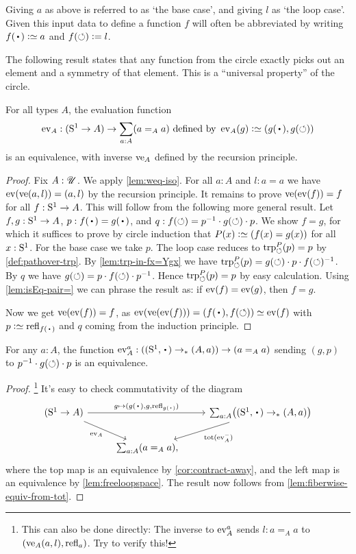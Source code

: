 Giving $a$ as above is referred to as `the base case', and
giving $l$ as `the loop case'. Given this input data to define
a function $f$ will often be abbreviated by writing
$f(\base)\defeq a$ and $f(\circlearrowleft)\mathrel{\vcentcolon=} l$.

The following result states that any function from the circle exactly
picks out an element and a symmetry of that element.
This is a ``universal property'' of the circle.

\begin{theorem}\label{lem:freeloopspace}
For all types $A$, the evaluation function
\[
\ev_A : (\Sc\to A)\to \sum_{a:A}(a=_Aa)\text{~defined by~}
\ev_A(g)\defeq (g(\base),g(\Sloop))
\]
is an equivalence, with inverse $\ve_A$ defined by the recursion principle.
\end{theorem}
\begin{proof}
Fix $A:{\mathscr{U}}$. We apply \cref{lem:weq-iso}.
For all $a:A$ and $l:a=a$ we have $\ev(\ve(a,l))=(a,l)$
by the recursion principle. It remains to prove
$\ve(\ev(f))=f$ for all $f:{\mathrm{S}^1}\to A$. This will follow
from the following more general result.
Let $f,g:{\mathrm{S}^1}\to A$,
$p: f(\base)= g(\base)$, and $q: f(\circlearrowleft) = p^{-1}\cdot g(\circlearrowleft)\cdot p$.
We show $f=g$, for which it suffices to prove by circle induction
that $P(x)\defeq(f(x)=g(x))$ for all $x:{\mathrm{S}^1}$.
For the base case we take $p$.
The loop case reduces to $\trp[P]{\Sloop}(p)=p$ by \cref{def:pathover-trp}.
By \cref{lem:trp-in-fx=Ygx} we have
$\trp[P]{\Sloop}(p)=g(\Sloop)\cdot p \cdot f(\Sloop)^{-1}$.
By $q$ we have $g(\circlearrowleft) = p\cdot f(\circlearrowleft) \cdot p^{-1}$.
Hence $\trp[P]{\Sloop}(p)=p$ by easy calculation.
Using \cref{lem:isEq-pair=} we can phrase the result
as: if $\ev(f)=\ev(g)$, then  $f=g$.

Now we get $\ve(\ev(f))=f$, as
$\ev(\ve(\ev(f)))=(f(\base),f(\Sloop))\jdeq\ev(f)$ with $p\defeq\refl{f(\base)}$
and $q$ coming from the induction principle.
\end{proof}
\begin{corollary}\label{cor:circle-loopspace}
  For any $a:A$, the function $\ev_A^a:((\Sc,\base)\to_* (A,a))\to (a=_Aa)$
  sending $(g,p)$ to $p^{-1}\cdot g(\circlearrowleft)\cdot p$ is an equivalence.
\end{corollary}
\begin{proof}\hskip-5pt\footnote{%
    This can also be done directly:
    The inverse to $\ev_A^a$ sends $l : a=_Aa$
    to $(\ve_A(a,l), \refl{a})$.
    Try to verify this!}
It's easy to check commutativity of the diagram
\[
  \begin{tikzcd}
    (\Sc \to A) \ar[rr,"{g\mapsto(g(\base),g,\refl{g(\base)})}"]
    \ar[dr,"\ev_A"'] & &
    \sum_{a:A}\bigl((\Sc,\base) \ptdto (A,a)\bigr)
    \ar[dl,"\tot(\ev_A^-)"] \\
    &  \,\sum_{a:A}(a=_A a),
  \end{tikzcd}
\]
where the top map is an equivalence by \cref{cor:contract-away},
and the left map is an equivalence by \cref{lem:freeloopspace}.
The result now follows from \cref{lem:fiberwise-equiv-from-tot}.
\end{proof}

